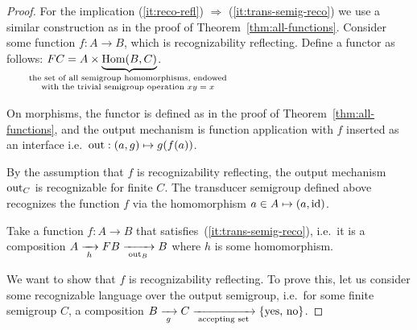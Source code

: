 \begin{proof}
    For the implication (\ref{it:reco-refl}) $\Rightarrow$ (\ref{it:trans-semig-reco}) we  use a similar construction as in the proof of Theorem~\ref{thm:all-functions}.
    Consider some function $f : A \to B$, which is recognizability reflecting. Define  a functor as follows:
    $\functor C = A \times \displaystyle\myunderbrace{\mathrm{Hom}(B,C)}{the set of all semigroup homomorphisms, endowed\\
    with the trivial semigroup operation $xy = x$}$.

    On morphisms, the functor is defined as in the proof of Theorem~\ref{thm:all-functions}, and the output mechanism  is function application with $f$ inserted as an interface i.e.~$\mathrm{out} : (a,g) \mapsto g(f(a))$.

    By the assumption that $f$ is recognizability reflecting, the output mechanism $\mathrm{out}_C$ is recognizable for finite $C$. The transducer semigroup defined above recognizes the function $f$ via the homomorphism $a \in A  \mapsto  (a,\mathrm{id})$.
    
    
 Take a function $f : A \to B$ that satisfies~(\ref{it:trans-semig-reco}), i.e.~it is a composition $A \xrightarrow[\;h\;]{} \functor B \xrightarrow[\;\outfun_B\;]{} B$
where $h$ is some homomorphism.

We want to show that $f$ is recognizability reflecting. To prove this, let us consider some recognizable language over the output semigroup, i.e.\ for some finite semigroup $C$, a composition $B \xrightarrow[\;g\;]{} C \xrightarrow[\;\text{accepting set}\;]{} \{\text{yes, no}\}$.


\end{proof}
